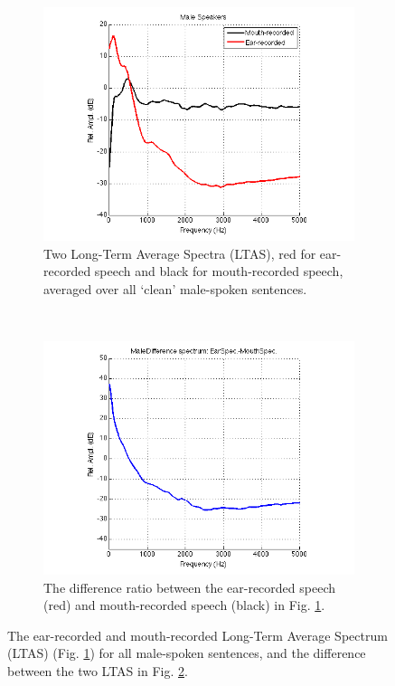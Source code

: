 \begin{figure}[H]
\centering
\begin{subfigure}{\textwidth} %
  \centering
  \includegraphics[width=0.75\linewidth]{figure/male_LTAS.png}
  \caption{Two Long-Term Average Spectra (LTAS), red for ear-recorded speech and black for mouth-recorded speech, averaged over all `clean' male-spoken sentences.}
  \label{male_LTAS}
\end{subfigure}%
\\[2ex]
\begin{subfigure}{\textwidth}
  \centering
  \includegraphics[width=0.75\linewidth]{figure/male_rel_dB.png}
  \caption{The difference ratio between the ear-recorded speech (red) and mouth-recorded speech (black) in Fig. \ref{male_LTAS}.}
  \label{male_rel_dB}
\end{subfigure}
\caption{The ear-recorded and mouth-recorded Long-Term Average Spectrum (LTAS) (Fig. \ref{male_LTAS}) for all male-spoken sentences, and the difference between the two LTAS in Fig. \ref{male_rel_dB}.}
\label{fig:male_LTAS}
\end{figure}

